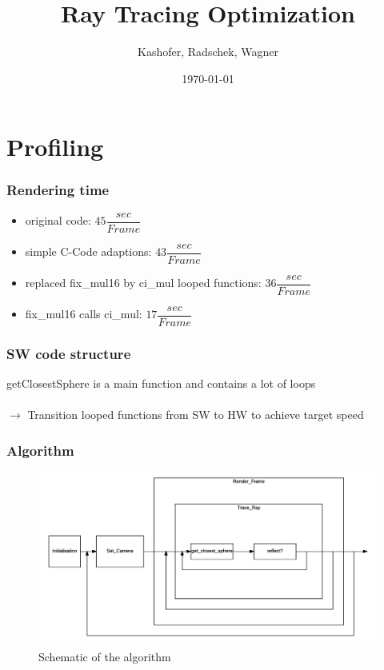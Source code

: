 \documentclass{beamer}
\title{Ray Tracing Optimization}
\author{Kashofer, Radschek, Wagner}
\date{\today}
\begin{document}
\maketitle
\frame{\tableofcontents[currentsection]}
 
\section{Profiling}
\begin{frame} %
	\frametitle{Rendering time} %
  	\begin{itemize}
		\item original code: $45 \dfrac{sec}{Frame}$
		\item simple C-Code adaptions: $43 \dfrac{sec}{Frame}$
		\item replaced fix\_mul16 by ci\_mul looped functions: $36 \dfrac{sec}{Frame}$
		\item fix\_mul16 calls ci\_mul: $17 \dfrac{sec}{Frame}$
	\end{itemize}

\end{frame}

\begin{frame} %
	\frametitle{SW code structure} %
	getClosestSphere is a main function and contains a lot of loops\\
	$\quad$\\
	$\rightarrow$ Transition looped functions from SW to HW to achieve target speed
\end{frame}

\begin{frame} %
	\frametitle{Algorithm} %
  	\begin{figure}
		\includegraphics[width=\textwidth]{algo.png}
		\caption{Schematic of the algorithm}
	\label{fig1}
	\end{figure}
\end{frame}
\end{document}
